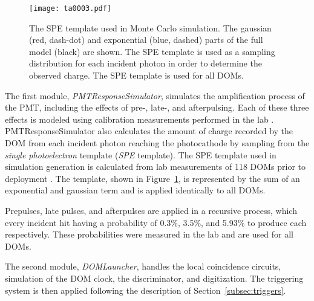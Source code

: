 \begin{figure}
\centering
\texttt{[image: ta0003.pdf]} 
\caption{The SPE template used in Monte Carlo simulation. The gaussian (red, dash-dot) and exponential (blue, dashed) parts of the full model (black) are shown. The SPE template is used as a sampling distribution for each incident photon in order to determine the observed charge. The SPE template is used for all DOMs.}
\label{fig:ta0003}
\end{figure}

The first module, \emph{PMTResponseSimulator}, simulates the amplification process of the PMT, including the effects of pre-, late-, and afterpulsing.
Each of these three effects is modeled using calibration measurements performed in the lab \cite{IceCube-PMT}.
PMTResponseSimulator also calculates the amount of charge recorded by the DOM from each incident photon reaching the photocathode by sampling from the \emph{single photoelectron} template (\emph{SPE} template).
The SPE template used in simulation generation is calculated from lab measurements of 118 DOMs prior to deployment \cite{TA0003}.
The template, shown in Figure~\ref{fig:ta0003}, is represented by the sum of an exponential and gaussian term and is applied identically to all DOMs.

Prepulses, late pulses, and afterpulses are applied in a recursive process, which every incident hit having a probability of 0.3\%, 3.5\%, and 5.93\% to produce each respectively.
These probabilities were measured in the lab and are used for all DOMs. 

The second module, \emph{DOMLauncher}, handles the local coincidence circuits, simulation of the DOM clock, the discriminator, and digitization.
The triggering system is then applied following the description of Section~\ref{subsec:triggers}.
